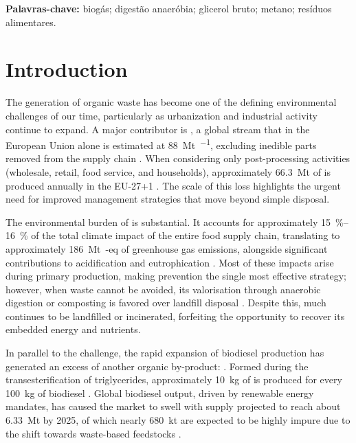 \documentclass[12pt, a4paper, oneside]{report}
\newcommand{\palavraschaves}{biogás; digestão anaeróbia; glicerol bruto; metano; resíduos alimentares}
\begin{document}
\begin{otherlanguage}{portuguese}
\vspace{1em}
\noindent\textbf{Palavras-chave:} \palavraschaves.
\clearpage{}
\endgroup
\end{otherlanguage}

\setcounter{page}{1}

\glsresetall

\clearpage{}\chapter{Introduction}
\label{ch:introduction}

The generation of organic waste has become one of the defining environmental challenges of our time, particularly as urbanization and industrial activity continue to expand. A major contributor is , a global stream that in the European Union alone is estimated at \qty{88}{\mega\tonne\per\yr}, excluding inedible parts removed from the supply chain \parencite{scherhaufer2018}. When considering only post-processing activities (wholesale, retail, food service, and households), approximately \qty{66.3}{\mega\tonne} of  is produced annually in the EU-27+1 \parencite{albizzati2021}. The scale of this loss highlights the urgent need for improved management strategies that move beyond simple disposal.

The environmental burden of  is substantial. It accounts for approximately \qtyrange{15}{16}{\percent} of the total climate impact of the entire food supply chain, translating to approximately \qty{186}{\mega\tonne\CO}-eq of greenhouse gas emissions, alongside significant contributions to acidification and eutrophication \parencite{scherhaufer2018}. Most of these impacts arise during primary production, making prevention the single most effective strategy; however, when waste cannot be avoided, its valorisation through anaerobic digestion or composting is favored over landfill disposal \parencite{albizzati2021, scherhaufer2018}. Despite this, much  continues to be landfilled or incinerated, forfeiting the opportunity to recover its embedded energy and nutrients.

In parallel to the  challenge, the rapid expansion of biodiesel production has generated an excess of another organic by-product: . Formed during the transesterification of triglycerides, approximately \qty{10}{\kilo\gram} of  is produced for every \qty{100}{\kilo\gram} of biodiesel \parencite{garlapati2016}. Global biodiesel output, driven by renewable energy mandates, has caused the  market to swell with  supply projected to reach about \qty{6.33}{\mega\tonne} by 2025, of which nearly \qty{680}{\kilo\tonne} are expected to be highly impure due to the shift towards waste-based feedstocks \parencite{attarbachi2023}.
\end{document}
